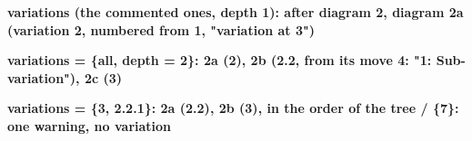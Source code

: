\documentclass{article}
\newcommand\case[1]{\par\medskip\noindent\textbf{#1}\par\nopagebreak}
\begin{document}

\case{variations (the commented ones, depth 1): after diagram 2, diagram 2a (variation 2, numbered from 1, "variation at 3")}

\case{variations = \{all, depth = 2\}: 2a (2), 2b (2.2, from its move 4: "1: Sub-variation"), 2c (3)}

\case{variations = \{3, 2.2.1\}: 2a (2.2), 2b (3), in the order of the tree / \{7\}: one warning, no variation}
\end{document}
